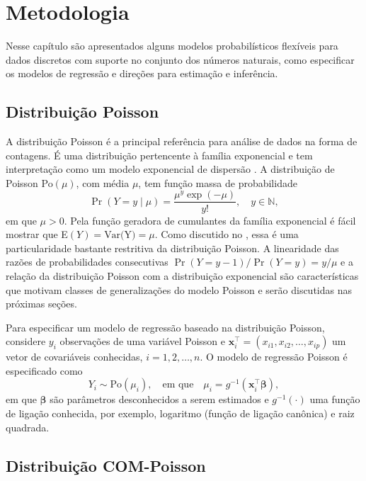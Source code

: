 \documentclass[
    oldfontcommands,
    11pt,
    openright,
    twoside,
    a4paper,
    english,
    brazil
]{abntex2}\usepackage[]{graphicx}\usepackage[]{color}
\begin{document}
\chapter{Metodologia}
\label{cha:metodologia}

Nesse capítulo são apresentados alguns modelos probabilísticos flexíveis
para dados discretos com suporte no conjunto dos números naturais, como
especificar os modelos de regressão e direções para estimação e
inferência.

\section{Distribuição Poisson}
\label{sec:poisson}

A distribuição Poisson é a principal referência para análise de dados na
forma de contagens. É uma distribuição pertencente à família exponencial
e tem interpretação como um modelo exponencial de dispersão
\citep{Jorgensen1997}. A distribuição de Poisson Po$(\mu)$, com média
$\mu$, tem função massa de probabilidade
\begin{equation}
  \label{eqn:pmf-poisson}
  \Pr(Y = y \mid \mu) = \frac{\mu^y \exp(-\mu)}{y!}, \quad y \in
  \mathbb{N},
\end{equation}
em que $\mu>0$. Pela função geradora de cumulantes da família
exponencial é fácil mostrar que E$(Y)=\text{Var(Y)}=\mu$. Como discutido
no , essa é uma particularidade bastante
restritiva da distribuição Poisson.  A linearidade das razões de
probabilidades consecutivas $\Pr(Y=y-1)/\Pr(Y=y) = y / \mu$ e a
relação da distribuição Poisson com a distribuição exponencial são
características que motivam classes de generalizações do modelo Poisson
e serão discutidas nas próximas seções.

Para especificar um modelo de regressão baseado na distribuição Poisson,
considere $y_i$ observações de uma variável Poisson e
$\bm{x}_i^\top = (x_{i1}, x_{i2}, \ldots, x_{ip})$ um vetor de
covariáveis conhecidas, $i=1,2,\ldots,n$.  O modelo de regressão Poisson
é especificado como
$$
Y_i \sim \text{Po}(\mu_i), \quad \text{em que} \quad \mu_i =
g^{-1}(\bm{x}_i^\top\bm{\beta}),
$$
em que $\bm{\beta}$ são parâmetros desconhecidos a serem estimados e
$g^{-1}(\cdot)$ uma função de ligação conhecida, por exemplo, logaritmo
(função de ligação canônica) e raiz quadrada.

\section{Distribuição COM-Poisson}
\label{sec:com-poisson}
\end{document}
